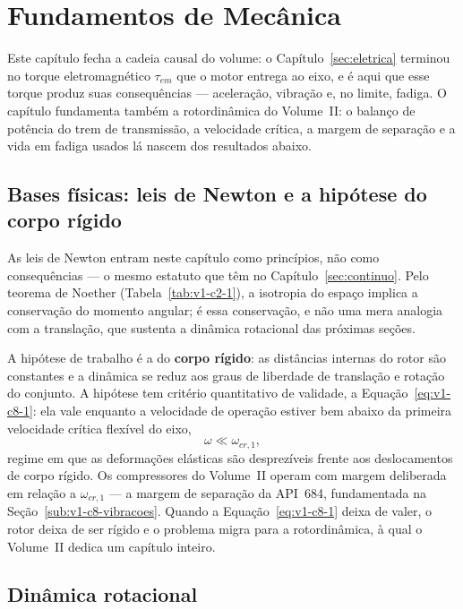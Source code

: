 \documentclass[12pt,a4paper]{article}
\numberwithin{equation}{section}
\numberwithin{table}{section}
\numberwithin{figure}{section}
\begin{document}
\section{Fundamentos de Mecânica}\label{sec:mecanica}

Este capítulo fecha a cadeia causal do volume: o Capítulo~\ref{sec:eletrica}
terminou no torque eletromagnético $\tau_{em}$ que o motor entrega ao eixo, e
é aqui que esse torque produz suas consequências --- aceleração, vibração e,
no limite, fadiga. O capítulo fundamenta também a rotordinâmica do Volume~II:
o balanço de potência do trem de transmissão, a velocidade crítica, a margem
de separação e a vida em fadiga usados lá nascem dos resultados abaixo.

\subsection{Bases físicas: leis de Newton e a hipótese do corpo
rígido}\label{sub:v1-c8-bases}

As leis de Newton entram neste capítulo como princípios, não como
consequências --- o mesmo estatuto que têm no Capítulo~\ref{sec:continuo}.
Pelo teorema de Noether (Tabela~\ref{tab:v1-c2-1}), a isotropia do espaço
implica a conservação do momento angular; é essa conservação, e não uma mera
analogia com a translação, que sustenta a dinâmica rotacional das próximas
seções.

A hipótese de trabalho é a do \textbf{corpo rígido}: as distâncias internas
do rotor são constantes e a dinâmica se reduz aos graus de liberdade de
translação e rotação do conjunto. A hipótese tem critério quantitativo de
validade, a Equação~\eqref{eq:v1-c8-1}: ela vale enquanto a velocidade de
operação estiver bem abaixo da primeira velocidade crítica flexível do eixo,
\begin{equation}\label{eq:v1-c8-1}
\omega \ll \omega_{cr,1},
\end{equation}
regime em que as deformações elásticas são desprezíveis frente aos
deslocamentos de corpo rígido. Os compressores do Volume~II operam com margem
deliberada em relação a $\omega_{cr,1}$ --- a margem de separação da API~684,
fundamentada na Seção~\ref{sub:v1-c8-vibracoes}. Quando a
Equação~\eqref{eq:v1-c8-1} deixa de valer, o rotor deixa de ser rígido e o
problema migra para a rotordinâmica, à qual o Volume~II dedica um capítulo
inteiro.

\subsection{Dinâmica rotacional}\label{sub:v1-c8-rotacional}
\end{document}
